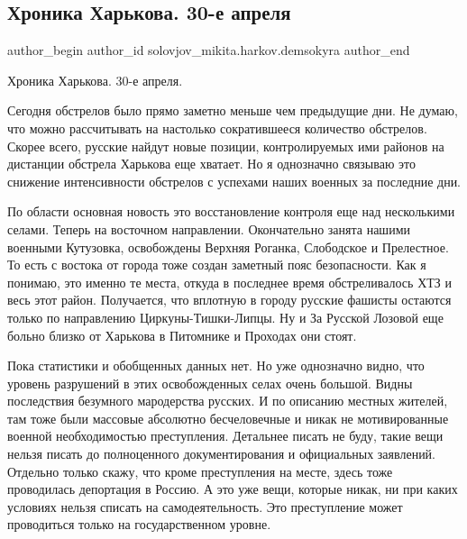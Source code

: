 
 
 
 
 
 
\subsection{Хроника Харькова. 30-е апреля}
\label{sec:30_04_2022.fb.solovjov_mikita.harkov.demsokyra.1.hronika}
 
\ifcmt
 author_begin
   author_id solovjov_mikita.harkov.demsokyra
 author_end
\fi

Хроника Харькова. 30-е апреля. 

Сегодня обстрелов было прямо заметно меньше чем предыдущие дни. Не думаю, что
можно рассчитывать на настолько сократившееся количество обстрелов. Скорее
всего, русские найдут новые позиции, контролируемых ими районов на дистанции
обстрела Харькова еще хватает. Но я однозначно связываю это снижение
интенсивности обстрелов с успехами наших военных за последние дни. 

По области основная новость это восстановление контроля еще над несколькими
селами. Теперь на восточном направлении. Окончательно занята нашими военными
Кутузовка, освобождены Верхняя Роганка, Слободское и Прелестное. То есть с
востока от города тоже создан заметный пояс безопасности. Как я понимаю, это
именно те места, откуда в последнее время обстреливалось ХТЗ и весь этот район.
Получается, что вплотную в городу русские фашисты остаются только по
направлению Циркуны-Тишки-Липцы. Ну и За Русской Лозовой еще больно близко от
Харькова в Питомнике и Проходах они стоят. 

Пока статистики и обобщенных данных нет. Но уже однозначно видно, что уровень
разрушений в этих освобожденных селах очень большой. Видны последствия
безумного мародерства русских. И по описанию местных жителей, там тоже были
массовые абсолютно бесчеловечные и никак не мотивированные военной
необходимостью преступления. Детальнее писать не буду, такие вещи нельзя писать
до полноценного документирования и официальных заявлений. Отдельно только
скажу, что кроме преступления на месте, здесь тоже проводилась депортация в
Россию. А это уже вещи, которые никак, ни при каких условиях нельзя списать на
самодеятельность. Это преступление может проводиться только на государственном
уровне. 

